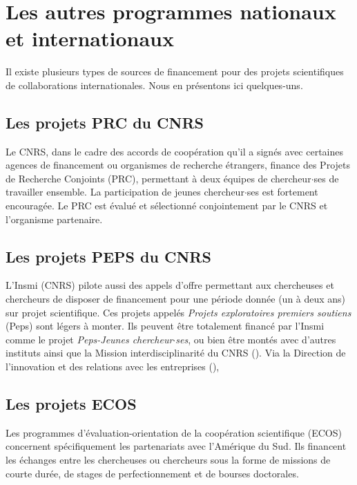 \section{Les autres programmes nationaux et internationaux}
Il existe plusieurs types de sources de financement pour des projets
scientifiques de collaborations internationales. Nous en pr\'esentons
ici quelques-uns.

\subsection{Les projets PRC du CNRS}

Le CNRS, dans le cadre des accords de coop{\'e}ration qu'il a sign{\'e}s avec certaines agences de financement ou organismes de recherche {\'e}trangers, 
finance des Projets de Recherche Conjoints (PRC), permettant {\`a} deux {\'e}quipes de chercheur$\cdot$ses de travailler ensemble. 
La participation de jeunes chercheur$\cdot$ses est fortement encourag{\'e}e.
Le PRC est {\'e}valu{\'e} et s{\'e}lectionn{\'e} conjointement par le CNRS et l’organisme partenaire. \\

\subsection{Les projets PEPS du CNRS}

L'Insmi (CNRS) pilote aussi des appels d'offre permettant aux chercheuses et chercheurs de disposer de financement pour une p\'eriode donn\'ee (un \`a deux ans) sur projet scientifique. 
Ces projets appel\'es {\it Projets exploratoires premiers soutiens} (Peps) sont l\'egers \`a monter. 
Ils peuvent \^etre totalement financ\'e par l'Insmi comme le projet {\it Peps-Jeunes chercheur$\cdot$ses}, ou bien \^etre mont\'es avec 
d'autres instituts ainsi que la Mission interdisciplinarit\'e du CNRS (). 
Via la Direction de l'innovation et des relations avec les entreprises (), 


\subsection{Les projets ECOS}
Les programmes d'\'evaluation-orientation de la coop\'eration
scientifique (ECOS) concernent sp\'eci\-fi\-que\-ment les
partenariats avec l'Am\'erique du Sud. Ils financent les \'echanges
entre les chercheuses ou chercheurs sous la forme de missions de courte dur\'ee, de
stages de perfectionnement et de bourses doctorales. \\

